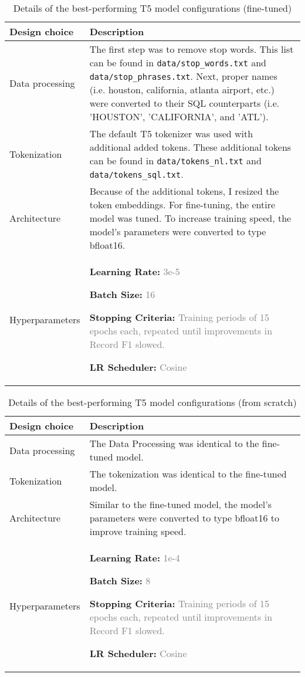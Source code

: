 \documentclass{article}
\begin{document}
\begin{table}[h!]
\centering
\begin{tabular}{p{3.5cm}p{10cm}}
\toprule
Design choice & Description \\
\midrule
Data processing & The first step was to remove stop words. This list can be found in  \verb|data/stop_words.txt| and \verb|data/stop_phrases.txt|. Next, proper names (i.e. houston, california, atlanta airport, etc.) were converted to their SQL counterparts (i.e. 'HOUSTON', 'CALIFORNIA', and 'ATL').  \\
Tokenization & The default T5 tokenizer was used with additional added tokens. These additional tokens can be found in \verb|data/tokens_nl.txt| and \verb|data/tokens_sql.txt|. \\
Architecture & Because of the additional tokens, I resized the token embeddings. For fine-tuning, the entire model was tuned. To increase training speed, the model's parameters were converted to type bfloat16. \\
Hyperparameters & 
\textbf{Learning Rate:} \textcolor{gray}{3e-5}
 
\textbf{Batch Size:} \textcolor{gray}{16} 

\textbf{Stopping Criteria:} \textcolor{gray}{Training periods of 15 epochs each, repeated until improvements in Record F1 slowed.} 

\textbf{LR Scheduler:} \textcolor{gray}{Cosine}  \\
\bottomrule
\end{tabular}
\caption{Details of the best-performing T5 model configurations (fine-tuned)}
\label{tab:t5_results_ft}
\end{table}


\begin{table}[h!]
\centering
\begin{tabular}{p{3.5cm}p{10cm}}
\toprule
Design choice & Description \\
\midrule
Data processing & The Data Processing was identical to the fine-tuned model. \\
Tokenization & The tokenization was identical to the fine-tuned model. \\
Architecture & Similar to the fine-tuned model, the model's parameters were converted to type bfloat16 to improve training speed. \\
Hyperparameters & \textbf{Learning Rate:} \textcolor{gray}{1e-4}

\textbf{Batch Size:} \textcolor{gray}{8} 

\textbf{Stopping Criteria:} \textcolor{gray}{Training periods of 15 epochs each, repeated until improvements in Record F1 slowed.} 

\textbf{LR Scheduler:} \textcolor{gray}{Cosine}  \\
\bottomrule
\end{tabular}
\caption{Details of the best-performing T5 model configurations (from scratch)}
\label{tab:t5_results_scratch}
\end{table}
\end{document}

